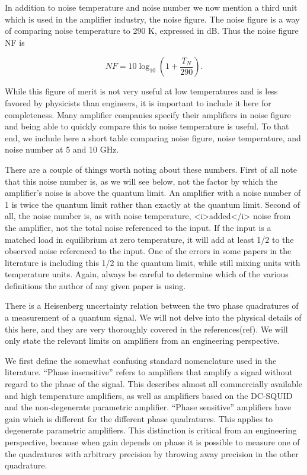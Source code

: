 \documentclass[11pt]{article}
\begin{document}
 
    	In addition to noise temperature and noise number we now mention a third unit which is used in the amplifier industry, the noise figure.  The noise figure is a way of comparing noise temperature to 290 K, expressed in dB.  Thus the noise figure NF is 





    $$NF = 10 \log_{10}{\left(1 + \frac{T_N}{290}\right)}.$$




    While this figure of merit is not very useful at low temperatures and is less favored by physicists than engineers, it is important to include it here for completeness.  Many amplifier companies specify their amplifiers in noise figure and being able to quickly compare this to noise temperature is useful.  To that end, we include here a short table comparing noise figure, noise temperature, and noise number at 5 and 10 GHz.  




    There are a couple of things worth noting about these numbers.  First of all note that this noise number is, as we will see below, not the factor by which the amplifier's noise is above the quantum limit.  An amplifier with a noise number of 1 is twice the quantum limit rather than exactly at the quantum limit.  Second of all, the noise number is, as with noise temperature, <i>added</i> noise from the amplifier, not the total noise referenced to the input.  If the input is a matched load in equilibrium at zero temperature, it will add at least 1/2 to the observed noise referenced to the input.  One of the errors in some papers in the literature is including this 1/2 in the quantum limit, while still mixing units with temperature units.  Again, always be careful to determine which of the various definitions the author of any given paper is using.




    	There is a Heisenberg uncertainty relation between the two phase quadratures of a measurement of a quantum signal. We will not delve into the physical details of this here, and they are very thoroughly covered in the references(ref).  We will only state the relevant limits on amplifiers from an engineering perspective.  




    	We first define the somewhat confusing standard nomenclature used in the literature.  ``Phase insensitive'' refers to amplifiers that amplify a signal without regard to the phase of the signal.  This describes almost all commercially available and high temperature amplifiers, as well as amplifiers based on the DC-SQUID and the non-degenerate parametric amplifier.  ``Phase sensitive'' amplifiers have gain which is different for the different phase quadratures.  This applies to degenerate parametric amplifiers.  This distinction is critical from an engineering perspective, because when gain depends on phase it is possible to measure one of the quadratures with arbitrary precision by throwing away precision in the other quadrature.  
\end{document}
